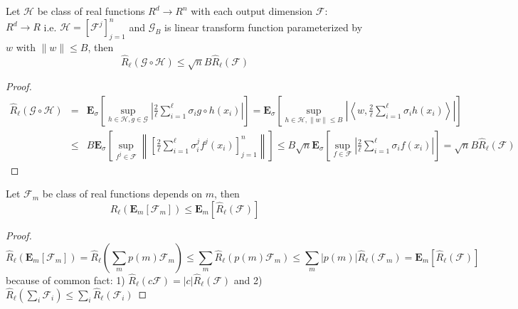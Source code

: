 \documentclass[9pt]{article}
\begin{document}
\begin{lemma}
    \label{lemma:composite_bound}
    Let $\mathcal{H}$ be class of real functions $R^d\rightarrow R^n$ with each output dimension
    $\mathcal{F}$: $R^d\rightarrow R$ i.e. $\mathcal{H}=\left[\mathcal{F}^j\right]_{j=1}^n $
    and $\mathcal{G}_B$ is linear transform function
    parameterized by $w$ with $\|w\|\leq B$, then
    $$
    \hat{R}_\ell(\mathcal{G}\circ\mathcal{H})\leq \sqrt{n}B\hat{R}_\ell(\mathcal{F})
    $$
\end{lemma}
\begin{proof}
    \begin{eqnarray*}
        \hat{R}_\ell(\mathcal{G}\circ\mathcal{H})&=&
    {\mathbf{E}}_\sigma\left[ \sup_{h\in\mathcal{H},g\in\mathcal{G}}\left|\frac{2}{\ell}\sum_{i=1}^\ell\sigma_i g\circ h(x_i) \right|\right]
    =
    {\mathbf{E}}_\sigma\left[ \sup_{h\in\mathcal{H},\|w\|\leq B}\left|\left< w, \frac{2}{\ell}\sum_{i=1}^\ell\sigma_ih(x_i) \right> \right| \right]\\
    &\leq &
    B{\mathbf{E}}_\sigma\left[ \sup_{f^j\in\mathcal{F}}\left\|\left[\frac{2}{\ell}\sum_{i=1}^\ell\sigma_i^jf^j(x_i)\right]_{j=1}^n \right\| \right] 
    \leq 
    B\sqrt{n}{\mathbf{E}}_\sigma\left[ \sup_{f\in\mathcal{F}}\left|\frac{2}{\ell}\sum_{i=1}^\ell\sigma_if(x_i) \right| \right]
    =\sqrt{n}B\hat{R}_\ell(\mathcal{F})
    \end{eqnarray*}
\end{proof}

\begin{lemma}
    \label{lemma:exp_bound}
    Let $\mathcal{F}_m$ be class of real functions depends on $m$, then
    $$
    \hat{R}_\ell(\mathbf{E}_m\left[\mathcal{F}_m\right]) \leq \mathbf{E}_m\left[\hat{R}_\ell(\mathcal{F})\right]
    $$
\end{lemma}
\begin{proof}
    $$
    \hat{R}_\ell(\mathbf{E}_m\left[\mathcal{F}_m\right]) =
    \hat{R}_\ell(\sum_m p(m)\mathcal{F}_m) \leq 
    \sum_m \hat{R}_\ell (p(m) \mathcal{F}_m)\leq
    \sum_m |p(m)| \hat{R}_\ell (\mathcal{F}_m)=
    \mathbf{E}_m\left[\hat{R}_\ell(\mathcal{F})\right]
    $$
    because of common fact: 
    1) $\hat{R}_\ell(c\mathcal{F})=|c|\hat{R}_\ell(\mathcal{F})$  and
    2) $\hat{R}_\ell(\sum_i \mathcal{F}_i)\leq \sum_i \hat{R}_\ell(\mathcal{F}_i)$
\end{proof}
\end{document}
